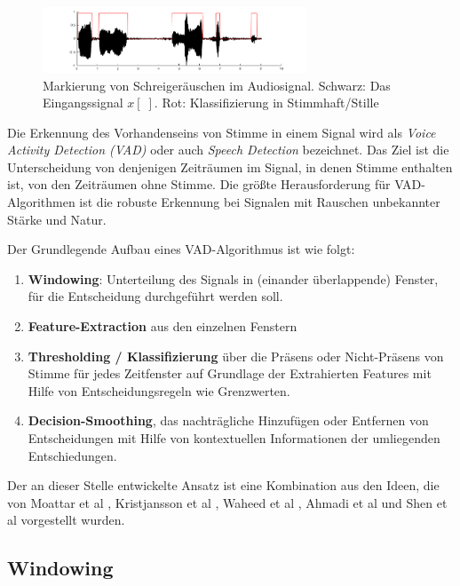 \begin{figure}
	\centering
	\includegraphics[width=0.7\textwidth]{bilder/vad_introduction01.png}
	\caption{Markierung von Schreigeräuschen im Audiosignal. Schwarz: Das Eingangssignal $x[\;]$. Rot: Klassifizierung in Stimmhaft/Stille}
	\label{img:vad01}
\end{figure}

Die Erkennung des Vorhandenseins von Stimme in einem Signal wird als \emph{Voice Activity Detection (VAD)} oder auch \emph{Speech Detection} bezeichnet. Das Ziel ist die Unterscheidung von denjenigen Zeiträumen im Signal, in denen Stimme enthalten ist, von den Zeiträumen ohne Stimme. Die größte Herausforderung für VAD-Algorithmen ist die robuste Erkennung bei Signalen mit Rauschen unbekannter Stärke und Natur. \cite[S. 1]{vad_kola} \cite[S. 1]{vad_Lisboa}

Der Grundlegende Aufbau eines VAD-Algorithmus ist wie folgt:
\begin{enumerate}
	\item \textbf{Windowing}: Unterteilung des Signals in (einander überlappende) Fenster, für die Entscheidung durchgeführt werden soll.
	\item \textbf{Feature-Extraction} aus den einzelnen Fenstern
	\item \textbf{Thresholding / Klassifizierung} über die Präsens oder Nicht-Präsens von Stimme für jedes Zeitfenster auf Grundlage der Extrahierten Features mit Hilfe von Entscheidungsregeln wie Grenzwerten.
	\item \textbf{Decision-Smoothing}, das nachträgliche Hinzufügen oder Entfernen von Entscheidungen mit Hilfe von kontextuellen Informationen der umliegenden Entschiedungen.\cite[S. 8 - 9]{vad_granada} \cite[S. 1 - 2]{vad_kola}
\end{enumerate}

Der an dieser Stelle entwickelte Ansatz ist eine Kombination aus den Ideen, die von  Moattar et al \cite{vad_Easy}, Kristjansson et al \cite{vad_Lisboa}, Waheed et al \cite{vad_entropy}, Ahmadi et al \cite{vad_ceps} und Shen et al\cite{vad_entropie02} vorgestellt wurden. 

\subsection{Windowing}
\label{sec:windowing}

